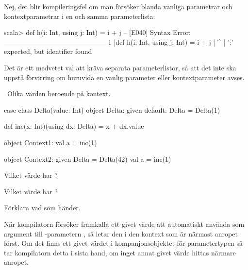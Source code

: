 \SubtaskSolved Nej, det blir kompileringsfel om man försöker blanda vanliga parametrar och kontextparametrar i en och samma parameterlista:
\begin{REPLnonum}
scala> def h(i: Int, using j: Int) = i + j
-- [E040] Syntax Error: ---------------------------------------------
1 |def h(i: Int, using j: Int) = i + j
  |                    ^
  |                    ':' expected, but identifier found
\end{REPLnonum}
Det är ett medvetet val att kräva separata parameterlistor, så att det inte ska uppstå förvirring om huruvida en vanlig parameter eller kontextparameter avses. 

\QUESTEND




\QUESTBEGIN

\Task \what~Olika värden beroende på kontext.
\begin{Code}
case class Delta(value: Int)
object Delta:
  given default: Delta = Delta(1)

def inc(x: Int)(using dx: Delta) = x + dx.value

object Context1:
  val a = inc(1)

object Context2:
  given Delta = Delta(42)
  val a = inc(1)

\end{Code}

\Subtask Vilket värde har ? 

\Subtask Vilket värde har ? 

\Subtask Förklara vad som händer.

\SOLUTION

\TaskSolved \what



\SubtaskSolved När kompilatorn försöker framkalla ett givet värde att automatiskt använda som argument till -parametern , så letar den i den kontext som är närmast anropet först. Om det finns ett givet värdet i kompanjonsobjektet för parametertypen så tar kompilatorn detta i sista hand, om inget annat givet värde hittas närmare anropet.

\QUESTEND





\QUESTBEGIN

